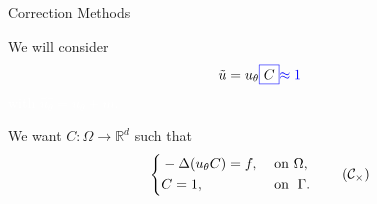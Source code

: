 \begin{frame}{Correction Methods}
\begin{minipage}{0.48\linewidth}
        \normalsize
        We will consider
        \begin{equation*}
            \tilde{u}=u_\theta \fcolorbox{blue}{white}{$C$}\textcolor{blue}{\approx 1}
        \end{equation*}
        \textcolor{white}{with $\hat{u_\theta}=u_\theta+m$.}
        
        We want $C: \Omega \rightarrow \mathbb{R}^d$ such that
        \begin{equation*}
            \left\{\begin{aligned}
                &-\Delta (u_\theta C)=f, \; &&\text{on } \Omega, \\
                &C=1, \; &&\text{on } \; \Gamma.
            \end{aligned}\right. \tag{$\mathcal{C}_\times$} \label{corr_mult}
        \end{equation*}
    \end{minipage}
\end{frame}

